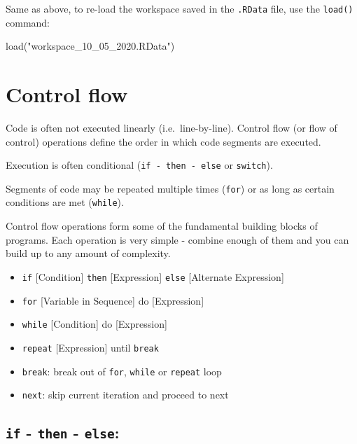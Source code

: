 \documentclass[
]{book}
\newenvironment{Shaded}{\begin{snugshade}}{\end{snugshade}}
\newcommand{\FunctionTok}[1]{\textcolor[rgb]{0.00,0.00,0.00}{#1}}
\newcommand{\NormalTok}[1]{#1}
\newcommand{\StringTok}[1]{\textcolor[rgb]{0.31,0.60,0.02}{#1}}
\providecommand{\tightlist}{%
  \setlength{\itemsep}{0pt}\setlength{\parskip}{0pt}}
\begin{document}
Same as above, to re-load the workspace saved in the \texttt{.RData} file, use the \texttt{load()} command:

\begin{Shaded}
\begin{Highlighting}[]
\FunctionTok{load}\NormalTok{(}\StringTok{"workspace\_10\_05\_2020.RData"}\NormalTok{)}
\end{Highlighting}
\end{Shaded}

\hypertarget{controlflow}{%
\chapter{Control flow}\label{controlflow}}

Code is often not executed linearly (i.e.~line-by-line). Control flow (or flow of control) operations define the order in which code segments are executed.

Execution is often conditional (\texttt{if\ -\ then\ -\ else} or \texttt{switch}).

Segments of code may be repeated multiple times (\texttt{for}) or as long as certain conditions are met (\texttt{while}).

Control flow operations form some of the fundamental building blocks of programs. Each operation is very simple - combine enough of them and you can build up to any amount of complexity.

\begin{itemize}
\tightlist
\item
  \texttt{if} {[}Condition{]} \texttt{then} {[}Expression{]} \texttt{else} {[}Alternate Expression{]}
\item
  \texttt{for} {[}Variable in Sequence{]} do {[}Expression{]}
\item
  \texttt{while} {[}Condition{]} do {[}Expression{]}
\item
  \texttt{repeat} {[}Expression{]} until \texttt{break}
\item
  \texttt{break}: break out of \texttt{for}, \texttt{while} or \texttt{repeat} loop
\item
  \texttt{next}: skip current iteration and proceed to next
\end{itemize}

\hypertarget{if---then---else}{%
\section{\texorpdfstring{\texttt{if} - \texttt{then} - \texttt{else}:}{if - then - else:}}\label{if---then---else}}
\end{document}
